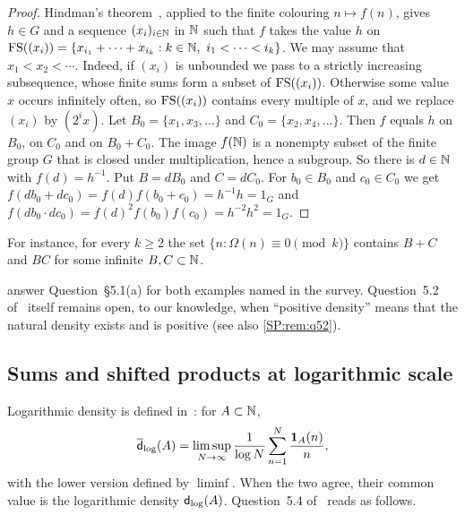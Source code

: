 \begin{proof}
Hindman's theorem~\cite[Theorem~3.1]{hindman1974finite}, applied to the finite colouring
$n\mapsto f(n)$, gives $h\in G$ and a sequence $(x_i)_{i\in\mathbb{N}}$ in $\mathbb{N}$ such that $f$ takes the
value $h$ on $\FS((x_i))=\{x_{i_1}+\dots+x_{i_k}:k\in\N,\ i_1<\dots<i_k\}$. We may assume that
$x_1<x_2<\cdots$. Indeed, if $(x_i)$ is unbounded we pass to a strictly increasing subsequence,
whose finite sums form a subset of $\mathrm{FS}((x_i))$. Otherwise some value $x$ occurs infinitely
often, so $\mathrm{FS}((x_i))$ contains every multiple of $x$, and we replace $(x_i)$ by $(2^ix)$. Let $B_0=\{x_1,x_3,\dots\}$ and $C_0=\{x_2,x_4,\dots\}$. Then $f$ equals $h$
on $B_0$, on $C_0$ and on $B_0+C_0$. The image $f(\mathbb{N})$ is a nonempty subset of the finite group
$G$ that is closed under multiplication, hence a subgroup. So there is $d\in\mathbb{N}$ with
$f(d)=h^{-1}$. Put $B=dB_0$ and $C=dC_0$. For $b_0\in B_0$ and $c_0\in C_0$ we get
$f(db_0+dc_0)=f(d)f(b_0+c_0)=h^{-1}h=1_G$ and
$f(db_0\cdot dc_0)=f(d)^2f(b_0)f(c_0)=h^{-2}h^2=1_G$.
\end{proof}

For instance, for every $k\ge2$ the set $\{n:\Omega(n)\equiv0\pmod k\}$ contains $B+C$ and $BC$
for some infinite $B,C\subset\mathbb{N}$.


\begin{remark}\label{SP:rem:liouville}
 answer Question~\S5.1(a) for both examples named in the
survey. Question~5.2 of~\cite{kra2023problems} itself remains open, to our knowledge, when ``positive density'' means
that the natural density exists and is positive (see also \cref{SP:rem:q52}).
\end{remark}

\subsection{Sums and shifted products at logarithmic scale}
\label{SP:sec:q54}

Logarithmic density is defined in~\cite[Definition~3.22]{kra2023problems}: for $A\subset\mathbb{N}$,
\[
\overline{\mathsf{d}}_{\log}(A)=\limsup_{N\to\infty}\frac1{\log N}\sum_{n=1}^N\frac{\mathbf{1}_A(n)}{n},
\]
with the lower version defined by $\liminf$. When the two agree, their common value is the
logarithmic density $\mathsf{d}_{\log}(A)$. Question~5.4 of~\cite{kra2023problems} reads as follows.

